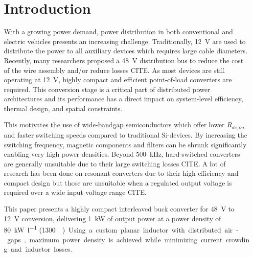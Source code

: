 \documentclass{IPEC2026}
\begin{document}
\section{Introduction}
With a growing power demand, power distribution in both conventional and electric vehicles presents an increasing challenge. Traditionally, \qty{12}{\V} are used to distribute the power to all auxiliary devices which requires large cable diameters. Recently, many researchers proposed a \qty{48}{\V} distribution bus to reduce the cost of the wire assembly and/or reduce losses CITE. As most devices are still operating at \qty{12}{\V}, highly compact and efficient point-of-load converters are required. This conversion stage is a critical part of distributed power architectures and its performance has a direct impact on system-level efficiency, thermal design, and spatial constraints. \par
This motivates the use of wide-bandgap semiconductors which offer lower $R_{ds,on}$ and faster switching speeds compared to traditional Si-devices. By increasing the switching frequency, magnetic components and filters can be shrunk significantly enabling very high power densities. Beyond \qty{500}{\kHz}, hard-switched converters are generally unsuitable due to their large switching losses CITE. A lot of research has been done on resonant converters due to their high efficiency and compact design but those are unsuitable when a regulated output voltage is required over a wide input voltage range CITE. \par

This paper presents a highly compact interleaved buck converter for \qty{48}{\V} to \qty{12}{\V} conversion, delivering \qty{1}{\kW} of output power at a power density of \qty{80}{\kW\per\l} (\qty{1300}{\W\per\cubic\inch}). Using a custom planar inductor with distributed air-gaps, maximum power density is achieved while minimizing current crowding and inductor losses. 


\end{document}
